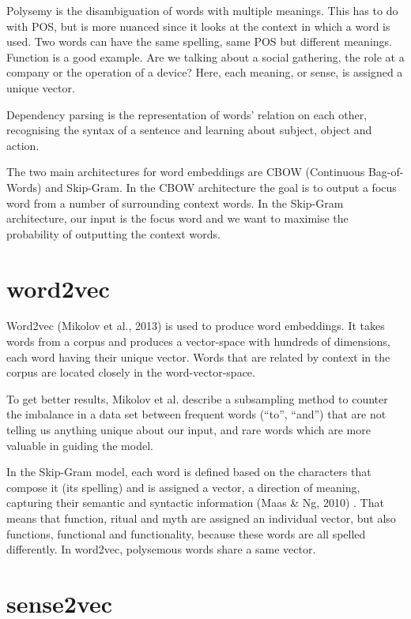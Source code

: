 \documentclass[12pt, usenames, dvipsnames]{report}
\begin{document}
\begin{flushleft}
Polysemy is the disambiguation of words with multiple meanings.
This has to do with POS, but is more nuanced since it looks at the context in which a word is used.
Two words can have the same spelling, same POS but different meanings.
Function is a good example.
Are we talking about a social gathering, the role at a company or the operation of a device? Here, each meaning, or sense, is assigned a unique vector.

Dependency parsing is the representation of words’ relation on each other, recognising the syntax of a sentence and learning about subject, object and action.

The two main architectures for word embeddings are CBOW (Continuous Bag-of-Words) and Skip-Gram.
In the CBOW architecture the goal is to output a focus word from a number of surrounding context words.
In the Skip-Gram architecture, our input is the focus word and we want to maximise the probability of outputting the context words.


\section{word2vec}

Word2vec (Mikolov et al., 2013) \cite{mikolov2013} is used to produce word embeddings.
It takes words from a corpus and produces a vector-space with hundreds of dimensions, each word having their unique vector.
Words that are related by context in the corpus are located closely in the word-vector-space.

To get better results, Mikolov et al. describe a subsampling method to counter the imbalance in a data set between frequent words (“to”, “and”) that are not telling us anything unique about our input, and rare words which are more valuable in guiding the model.

In the Skip-Gram model, each word is defined based on the characters that compose it (its spelling) and is assigned a vector, a direction of meaning, capturing their semantic and syntactic information (Maas \& Ng, 2010) \cite{maas2010}.
That means that function, ritual and myth are assigned an individual vector, but also functions, functional and functionality, because these words are all spelled differently.
In word2vec, polysemous words share a same vector.


\section{sense2vec}


\end{flushleft}
\end{document}
